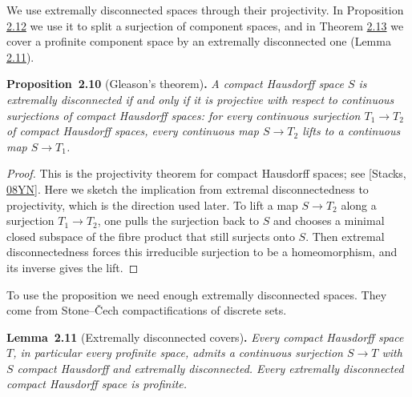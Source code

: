\documentclass[11pt]{article}
\newenvironment{bpstatement}[2]{\par\addvspace{0.6\baselineskip}\noindent\textbf{#1}#2\textbf{.}\enspace\ignorespaces}
  {\par\addvspace{0.4\baselineskip}}
\newenvironment{bpstatementit}[2]{\begin{bpstatement}{#1}{#2}\itshape\ignorespaces}{\end{bpstatement}}
\begin{document}
We use extremally disconnected spaces through their projectivity. In Proposition \hyperref[bp34]{2.12} we use it to split a surjection of component spaces, and in Theorem \hyperref[bp37]{2.13} we cover a profinite component space by an extremally disconnected one (Lemma \hyperref[bp31]{2.11}).

\label{bp28}%
\begin{bpstatementit}{Proposition~2.10}{ (Gleason's theorem)}
A compact Hausdorff space \(S\) is extremally disconnected if and only if it is projective with respect to continuous surjections of compact Hausdorff spaces: for every continuous surjection \(T_1\to T_2\) of compact Hausdorff spaces, every continuous map \(S\to T_2\) lifts to a continuous map \(S\to T_1\).
\end{bpstatementit}

\begin{proof}[{Proof}]\label{bp29}%
This is the projectivity theorem for compact Hausdorff spaces; see [Stacks, \href{https://stacks.math.columbia.edu/tag/08YN}{08YN}]. Here we sketch the implication from extremal disconnectedness to projectivity, which is the direction used later. To lift a map \(S\to T_2\) along a surjection \(T_1\to T_2\), one pulls the surjection back to \(S\) and chooses a minimal closed subspace of the fibre product that still surjects onto \(S\). Then extremal disconnectedness forces this irreducible surjection to be a homeomorphism, and its inverse gives the lift.
\end{proof}

\label{bp30}%
To use the proposition we need enough extremally disconnected spaces. They come from Stone–Čech compactifications of discrete sets.

\label{bp31}%
\begin{bpstatementit}{Lemma~2.11}{ (Extremally disconnected covers)}
Every compact Hausdorff space \(T\), in particular every profinite space, admits a continuous surjection \(S\to T\) with \(S\) compact Hausdorff and extremally disconnected. Every extremally disconnected compact Hausdorff space is profinite.
\end{bpstatementit}
\end{document}
